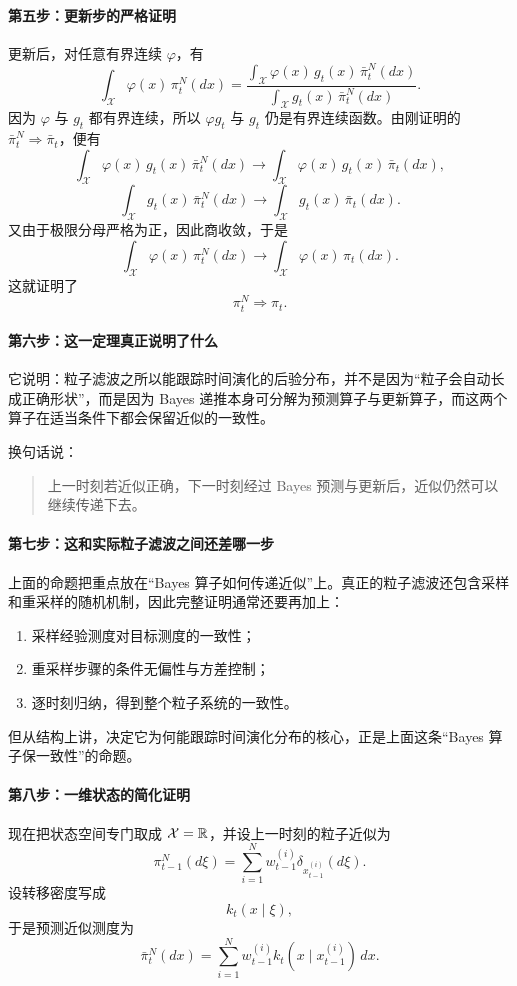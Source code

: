 \documentclass[12pt,a4paper]{ctexart}
\begin{document}
\paragraph{第五步：更新步的严格证明}
更新后，对任意有界连续 \(\varphi\)，有
\[
\int_{\mathcal X}\varphi(x)\,\pi_t^N(dx)
=
\frac{\int_{\mathcal X}\varphi(x)\,g_t(x)\,\bar\pi_t^N(dx)}
{\int_{\mathcal X}g_t(x)\,\bar\pi_t^N(dx)}.
\]
因为 \(\varphi\) 与 \(g_t\) 都有界连续，所以 \(\varphi g_t\) 与 \(g_t\) 仍是有界连续函数。由刚证明的
\(\bar\pi_t^N \Rightarrow \bar\pi_t\)，便有
\[
\int_{\mathcal X}\varphi(x)\,g_t(x)\,\bar\pi_t^N(dx)
\to
\int_{\mathcal X}\varphi(x)\,g_t(x)\,\bar\pi_t(dx),
\]
\[
\int_{\mathcal X}g_t(x)\,\bar\pi_t^N(dx)
\to
\int_{\mathcal X}g_t(x)\,\bar\pi_t(dx).
\]
又由于极限分母严格为正，因此商收敛，于是
\[
\int_{\mathcal X}\varphi(x)\,\pi_t^N(dx)
\to
\int_{\mathcal X}\varphi(x)\,\pi_t(dx).
\]
这就证明了
\[
\pi_t^N \Rightarrow \pi_t.
\]

\paragraph{第六步：这一定理真正说明了什么}
它说明：粒子滤波之所以能跟踪时间演化的后验分布，并不是因为“粒子会自动长成正确形状”，而是因为 Bayes 递推本身可分解为预测算子与更新算子，而这两个算子在适当条件下都会保留近似的一致性。

换句话说：
\begin{quote}
上一时刻若近似正确，下一时刻经过 Bayes 预测与更新后，近似仍然可以继续传递下去。
\end{quote}

\paragraph{第七步：这和实际粒子滤波之间还差哪一步}
上面的命题把重点放在“Bayes 算子如何传递近似”上。真正的粒子滤波还包含采样和重采样的随机机制，因此完整证明通常还要再加上：
\begin{enumerate}
  \item 采样经验测度对目标测度的一致性；
  \item 重采样步骤的条件无偏性与方差控制；
  \item 逐时刻归纳，得到整个粒子系统的一致性。
\end{enumerate}
但从结构上讲，决定它为何能跟踪时间演化分布的核心，正是上面这条“Bayes 算子保一致性”的命题。

\paragraph{第八步：一维状态的简化证明}
现在把状态空间专门取成 \(\mathcal X=\mathbb{R}\)，并设上一时刻的粒子近似为
\[
\pi_{t-1}^N(d\xi)=\sum_{i=1}^N w_{t-1}^{(i)}\delta_{x_{t-1}^{(i)}}(d\xi).
\]
设转移密度写成
\[
k_t(x\mid \xi),
\]
于是预测近似测度为
\[
\bar\pi_t^N(dx)
=
\sum_{i=1}^N w_{t-1}^{(i)}k_t(x\mid x_{t-1}^{(i)})\,dx.
\]
\end{document}

